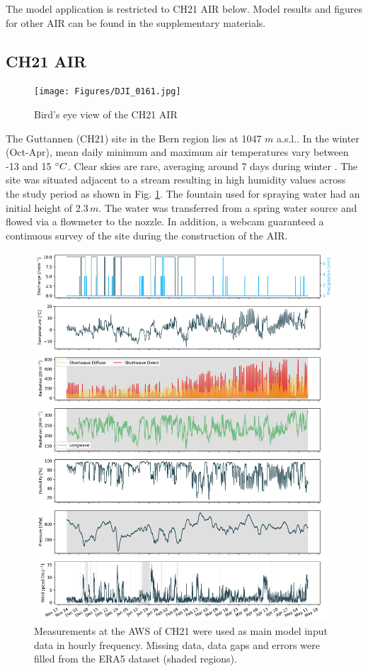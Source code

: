 \documentclass[utf8]{frontiersSCNS} %
\begin{document}
The model application is restricted to CH21 AIR below. Model results and figures for other AIR can be found in the
supplementary materials.

\subsection{CH21 AIR}

    \begin{figure} \begin{center} \texttt{[image: Figures/DJI\_0161.jpg]} \end{center} \caption{Bird's eye view of the CH21 AIR} \label{fig:site} \end{figure}

The Guttannen (CH21) site in the Bern region lies at 1047 $m$ a.s.l.. In the winter (Oct-Apr), mean daily minimum and
maximum air temperatures vary between -13 and 15 $\degree C$. Clear skies are rare, averaging around 7 days during
winter \citep{eispalast}. The site was situated adjacent to a stream resulting in high humidity values across the study
period as shown in Fig. \ref{fig:site}. The fountain used for spraying water had an initial height of 2.3\,$m$. The
water was transferred from a spring water source and flowed via a flowmeter to the nozzle.  In addition, a webcam
guaranteed a continuous survey of the site during the construction of the AIR.

\begin{figure} \centering \includegraphics[width=\linewidth]{./Figures/Model_Input_Manual.jpg} 
\caption{Measurements at the AWS of CH21 were used as main model input data in hourly frequency. Missing data, data gaps
and errors were filled from the ERA5 dataset (shaded regions).} 
    \label{fig:input} \end{figure}
\end{document}
